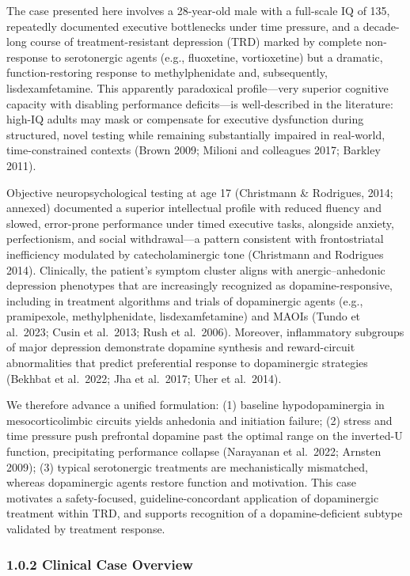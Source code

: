 The case presented here involves a 28-year-old male with a full-scale IQ of 135, repeatedly documented executive bottlenecks under time pressure, and a decade-long course of treatment-resistant depression (TRD) marked by complete non-response to serotonergic agents (e.g., fluoxetine, vortioxetine) but a dramatic, function-restoring response to methylphenidate and, subsequently, lisdexamfetamine. This apparently paradoxical profile---very superior cognitive capacity with disabling performance deficits---is well-described in the literature: high-IQ adults may mask or compensate for executive dysfunction during structured, novel testing while remaining substantially impaired in real-world, time-constrained contexts (Brown 2009; Milioni and colleagues 2017; Barkley 2011).

Objective neuropsychological testing at age 17 (Christmann \& Rodrigues, 2014; annexed) documented a superior intellectual profile with reduced fluency and slowed, error-prone performance under timed executive tasks, alongside anxiety, perfectionism, and social withdrawal---a pattern consistent with frontostriatal inefficiency modulated by catecholaminergic tone (Christmann and Rodrigues 2014). Clinically, the patient's symptom cluster aligns with anergic--anhedonic depression phenotypes that are increasingly recognized as dopamine-responsive, including in treatment algorithms and trials of dopaminergic agents (e.g., pramipexole, methylphenidate, lisdexamfetamine) and MAOIs (Tundo et al.~2023; Cusin et al.~2013; Rush et al.~2006). Moreover, inflammatory subgroups of major depression demonstrate dopamine synthesis and reward-circuit abnormalities that predict preferential response to dopaminergic strategies (Bekhbat et al.~2022; Jha et al.~2017; Uher et al.~2014).

We therefore advance a unified formulation: (1) baseline hypodopaminergia in mesocorticolimbic circuits yields anhedonia and initiation failure; (2) stress and time pressure push prefrontal dopamine past the optimal range on the inverted-U function, precipitating performance collapse (Narayanan et al.~2022; Arnsten 2009); (3) typical serotonergic treatments are mechanistically mismatched, whereas dopaminergic agents restore function and motivation. This case motivates a safety-focused, guideline-concordant application of dopaminergic treatment within TRD, and supports recognition of a dopamine-deficient subtype validated by treatment response.

\subsubsection{1.0.2 Clinical Case Overview}\label{10b_traad-clinical-case-overview}

